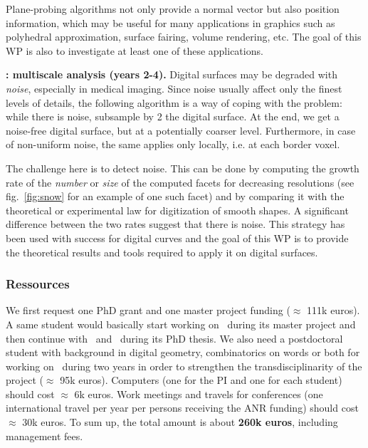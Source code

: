 Plane-probing algorithms not only provide a normal vector but also position information, which may be useful for many applications in graphics such as polyhedral approximation, surface fairing, volume rendering, etc. The goal of this WP is also to investigate at least one of these applications.   

\noindent\textbf{\wpScale: multiscale analysis (years 2-4).} Digital surfaces may be degraded with \emph{noise}, especially in medical imaging. Since noise usually affect only the finest levels of details, the following algorithm is a way of coping with the problem: while there is noise, subsample by 2 the digital surface. At the end, we get a noise-free digital surface, but at a potentially coarser level. Furthermore, in case of non-uniform noise, the same applies only locally, i.e. at each border voxel.  

The challenge here is to detect noise. This can be done by computing the growth rate of the \emph{number} or \emph{size} of the computed facets for decreasing resolutions (see fig.~\ref{fig:snow} for an example of one such facet) and by comparing it with the theoretical or experimental law for digitization of smooth shapes. A significant difference between the two rates suggest that there is noise. 
This strategy has been used with success for digital curves \cite{Kerautret2012} and the goal of this WP is to provide the theoretical results and tools required to apply it on digital surfaces. 


\subsubsection{Ressources}
\label{sec:ressources}



We first request one PhD grant and one master project funding ($\approx$ 111k euros). A same student would basically start working on \wpPPA~during its master project and then continue with \wpEstim~and \wpScale~during its PhD thesis. We also need a postdoctoral student with background in digital geometry, combinatorics on words or both for working on \wpPattern~during two years in order to strengthen the transdisciplinarity of the project ($\approx$ 95k euros). 
Computers (one for the PI and one for each student) should cost $\approx$ 6k euros. Work meetings and travels for conferences (one international travel per year per persons receiving the ANR funding) should cost $\approx$ 30k euros. 
To sum up, the total amount is about \textbf{260k euros}, including management fees. 



